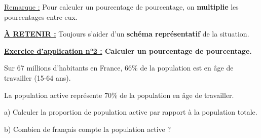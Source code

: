 \documentclass[12pt]{article}
\begin{document}
\vspace{5pt}

\underline{Remarque :} Pour calculer un pourcentage de pourcentage, on \textbf{multiplie} les pourcentages entre eux.

\vspace{5pt}

\begin{center}
    {\color{red}\underline{\textbf{À RETENIR :}}} Toujours s'aider d'un 
    \textbf{schéma représentatif} de la situation.    
\end{center}

\vspace{10pt}

\begin{mdframed}[
    linewidth=1pt,
    linecolor=RoyalBlue,
    innertopmargin=10pt,
    innerbottommargin=10pt
]
{\color{RoyalBlue}\textbf{\underline{Exercice d'application n°2 :} Calculer un 
pourcentage de pourcentage.}}
\vspace{5pt}

Sur 67 millions d’habitants en France, 66\% de la population est en âge de travailler (15-64 ans).

\vspace{5pt}

La population active représente 70\% de la population en âge de travailler.

\vspace{5pt}

a) Calculer la proportion de population active par rapport à la population totale.

\vspace{5pt}

b) Combien de français compte la population active ?

\vspace{0.5cm}
{\color{black!30}\dotfill}

\vspace{0.5cm}
{\color{black!30}\dotfill}

\vspace{0.5cm}
{\color{black!30}\dotfill}

\vspace{0.5cm}
{\color{black!30}\dotfill}

\vspace{0.5cm}
{\color{black!30}\dotfill}

\vspace{0.5cm}
{\color{black!30}\dotfill}

\vspace{20pt}

\end{mdframed}
\end{document}
